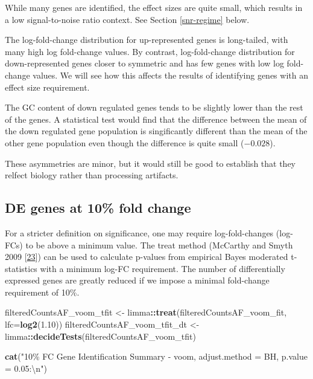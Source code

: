 \documentclass[
]{book}
\newenvironment{Shaded}{\begin{snugshade}}{\end{snugshade}}
\newcommand{\CharTok}[1]{\textcolor[rgb]{0.31,0.60,0.02}{#1}}
\newcommand{\DataTypeTok}[1]{\textcolor[rgb]{0.13,0.29,0.53}{#1}}
\newcommand{\FloatTok}[1]{\textcolor[rgb]{0.00,0.00,0.81}{#1}}
\newcommand{\KeywordTok}[1]{\textcolor[rgb]{0.13,0.29,0.53}{\textbf{#1}}}
\newcommand{\NormalTok}[1]{#1}
\newcommand{\OperatorTok}[1]{\textcolor[rgb]{0.81,0.36,0.00}{\textbf{#1}}}
\newcommand{\StringTok}[1]{\textcolor[rgb]{0.31,0.60,0.02}{#1}}
\begin{document}
While many genes are identified, the effect sizes are quite small,
which results in a low signal-to-noise ratio context. See
Section \ref{snr-regime} below.

The log-fold-change distribution for up-represented genes is long-tailed,
with many high log fold-change values.
By contrast, log-fold-change distribution for down-represented genes
closer to symmetric and has few genes with low log fold-change values.
We will see how this affects the results of identifying genes with
an effect size requirement.

The GC content of down regulated genes tends to be slightly lower than the
rest of the genes. A statistical test would find that the difference
between the mean of the down regulated gene population is singificantly different
than the mean of the other gene population even though the difference is
quite small
(\(-0.028\)).

These asymmetries are minor, but it would still be good to establish that
they relfect biology rather than processing artifacts.

\hypertarget{de-genes-at-10-fold-change}{%
\subsection*{DE genes at 10\% fold change}\label{de-genes-at-10-fold-change}}

For a stricter definition on significance, one may require log-fold-changes
(log-FCs) to be above a minimum value. The treat method
(McCarthy and Smyth 2009 {[}\protect\hyperlink{ref-McCarthy:2009aa}{23}{]}) can be used to calculate p-values
from empirical Bayes moderated t-statistics with a minimum log-FC requirement.
The number of differentially expressed genes are greatly reduced if we
impose a minimal fold-change requirement of 10\%.

\begin{Shaded}
\begin{Highlighting}[]
\NormalTok{filteredCountsAF\_voom\_tfit <{-}}\StringTok{ }\NormalTok{limma}\OperatorTok{::}\KeywordTok{treat}\NormalTok{(filteredCountsAF\_voom\_fit, }\DataTypeTok{lfc=}\KeywordTok{log2}\NormalTok{(}\FloatTok{1.10}\NormalTok{))}
\NormalTok{filteredCountsAF\_voom\_tfit\_dt <{-}}\StringTok{ }\NormalTok{limma}\OperatorTok{::}\KeywordTok{decideTests}\NormalTok{(filteredCountsAF\_voom\_tfit)}

\KeywordTok{cat}\NormalTok{(}\StringTok{"10\% FC Gene Identification Summary {-} voom, adjust.method = BH, p.value = 0.05:}\CharTok{\textbackslash{}n}\StringTok{"}\NormalTok{)}
\end{Highlighting}
\end{Shaded}
\end{document}
